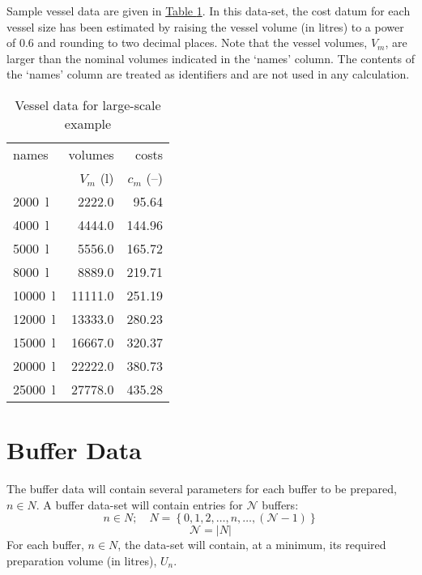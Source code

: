 Sample vessel data are given in \hyperref[tbl.vessel]{Table \ref*{tbl.vessel}}.
In this data-set, the cost datum for each vessel size has been estimated by
raising the vessel volume (in litres) to a power of 0.6 and rounding to two
decimal places.
Note that the vessel volumes, $V_{m}$, are larger than the nominal volumes
indicated in the `names' column.  The contents of the `names' column are
treated as identifiers and are not used in any calculation.
\begin{table}[h!]
    \centering
    \caption{Vessel data for large-scale example}
    \label{tbl.vessel}
    \begin{tabular}{l | r | r}
        names & volumes & costs\\
        & $V_{m}$ (l) & $c_{m}$ (--)\\\hline
        \SI{2000}{\litre} & \SI{2222.0}{} & \SI{95.64}{}\\
        \SI{4000}{\litre} & \SI{4444.0}{} & \SI{144.96}{}\\
        \SI{5000}{\litre} & \SI{5556.0}{} & \SI{165.72}{}\\
        \SI{8000}{\litre} & \SI{8889.0}{} & \SI{219.71}{}\\
        \SI{10000}{\litre} & \SI{11111.0}{} & \SI{251.19}{}\\
        \SI{12000}{\litre} & \SI{13333.0}{} & \SI{280.23}{}\\
        \SI{15000}{\litre} & \SI{16667.0}{} & \SI{320.37}{}\\
        \SI{20000}{\litre} & \SI{22222.0}{} & \SI{380.73}{}\\
        \SI{25000}{\litre} & \SI{27778.0}{} & \SI{435.28}{}\\
    \end{tabular}
\end{table}

\section{Buffer Data}\label{S.bufferdata}
The buffer data will contain several parameters for each buffer to be prepared,
$n \in N$.
A buffer data-set will contain entries for $\mathcal{N}$ buffers:
\begin{equation}
    n \in N; \quad N = \left\{ 0, 1, 2, \ldots, n, \ldots, \left(
    \mathcal{N} - 1 \right) \right\}
\end{equation}
\begin{equation}
    \mathcal{N} = |N|
\end{equation}
For each buffer, $n \in N$, the data-set will contain, at a minimum, its
required preparation volume (in litres), $U_{n}$.

